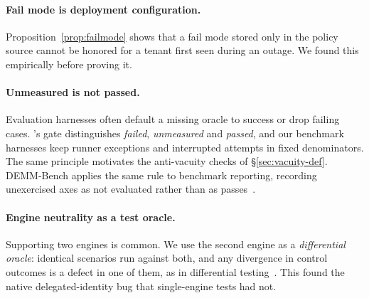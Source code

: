 \paragraph{Fail mode is deployment configuration.} Proposition~\ref{prop:failmode} shows that a fail mode stored only in the policy source cannot be honored for a tenant first seen during an outage. We found this empirically before proving it.

\paragraph{Unmeasured is not passed.} Evaluation harnesses often default a missing oracle to success or drop failing cases. \method{}'s gate distinguishes \emph{failed}, \emph{unmeasured} and \emph{passed}, and our benchmark harnesses keep runner exceptions and interrupted attempts in fixed denominators. The same principle motivates the anti-vacuity checks of \S\ref{sec:vacuity-def}. DEMM-Bench applies the same rule to benchmark reporting, recording unexercised axes as not evaluated rather than as passes~\cite{solozobov2026demmbench}.

\paragraph{Engine neutrality as a test oracle.} Supporting two engines is common. We use the second engine as a \emph{differential oracle}: identical scenarios run against both, and any divergence in control outcomes is a defect in one of them, as in differential testing~\cite{mckeeman1998differential}. This found the native delegated-identity bug that single-engine tests had not.
